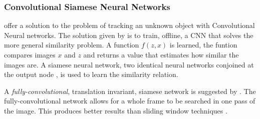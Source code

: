  \subsubsection{Convolutional Siamese Neural Networks}
  \citeauthor{bertinetto2016} \cite{bertinetto2016} offer a solution to the problem of tracking an unknown object with Convolutional Neural networks.
  The solution given by \citeauthor{bertinetto2016} is to train, offline, a CNN that solves the more general similarity problem.
  A function $f(z,x)$ is learned, the funtion compares images $x$ and $z$ and returns a value that estimates how similar the images are.
  A siamese neural network, two identical neural networks conjoined at the output node \cite{bromley1993}, is used to learn the similarity relation.

  A \textit{fully-convolutional}, translation invariant, siamese network is suggested by \citeauthor{bertinetto2016}.
  The fully-convolutional network allows for a whole frame to be searched in one pass of the image.
  This produces better results than sliding window techniques \cite{kang2014}.

